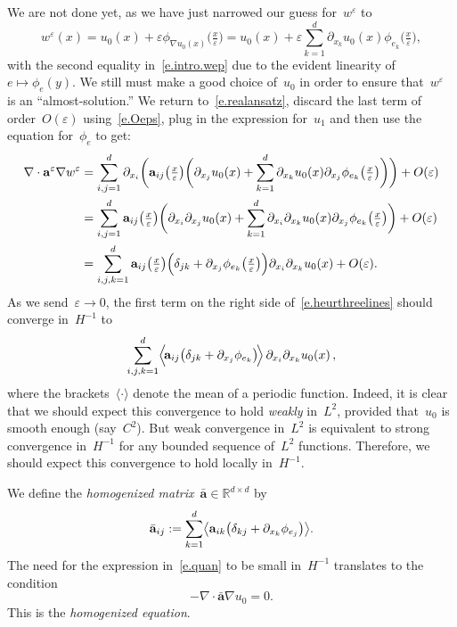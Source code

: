 \documentclass[11pt,twoside]{article} %
\numberwithin{equation}{section}
\theoremstyle{definition}
\let\originalleft\left
\let\originalright\right
\renewcommand{\left}{\mathopen{}\mathclose\bgroup\originalleft}
\renewcommand{\right}{\aftergroup\egroup\originalright}
\newcommand*{\R}{\ensuremath{\mathbb{R}}}
\newcommand{\eps}{\varepsilon}
\newcommand{\ep}{\eps}
\renewcommand{\a}{\mathbf{a}}
\newcommand{\ahom}{\bar{\a}}
\begin{document}
\smallskip

We are not done yet, as we have just narrowed our guess for~$w^\ep$ to 
\begin{equation}
\label{e.intro.wep}
w^\ep (x) = u_0(x) + \ep \phi_{\nabla u_0(x)}\bigl(\tfrac x\ep \bigr) 
= 
u_0(x) + \ep \sum_{k=1}^d \partial_{x_k}u_0(x) \phi_{e_k}\bigl(\tfrac x\ep \bigr),
\end{equation}
with the second equality in~\eqref{e.intro.wep} due to the evident linearity of~$e\mapsto \phi_e(y)$. We still must make a good choice of~$u_0$ in order to ensure that~$w^\ep$ is an ``almost-solution.'' We return to~\eqref{e.realansatz}, discard the last term of order~$O(\ep)$ using~\eqref{e.Oeps}, plug in the expression for~$u_1$ and then use the equation for~$\phi_e$ to get:
\begin{align}
\label{e.heurthreelines}
\nabla \cdot\a^\ep \nabla w^\ep 
&
=
\sum_{i,j=1}^d
\partial_{x_i} 
\biggl(
\a_{ij}\bigl(\tfrac x\ep \bigr) 
\biggl(
\partial_{x_j} u_0(x) 
+
\sum_{k=1}^d \partial_{x_k}u_0(x) \partial_{x_j} \phi_{e_k} \bigl(\tfrac x\ep \bigr)
\biggr)
\biggr)
+O(\ep)
\notag \\ &
=
\sum_{i,j=1}^d
\a_{ij}\bigl(\tfrac x\ep \bigr)
\biggl( \partial_{x_i}\partial_{x_j} u_0(x) + 
\sum_{k=1}^d \partial_{x_i}\partial_{x_k}u_0(x) \partial_{x_j} \phi_{e_k} \bigl(\tfrac x\ep \bigr) \biggr)
+O(\ep)
\notag \\ &
=
\sum_{i,j,k=1}^d
\a_{ij}\bigl(\tfrac x\ep \bigr) 
\Bigl( \delta_{jk} 
+ 
\partial_{x_j} \phi_{e_k} \bigl(\tfrac x\ep \bigr) \Bigr)
\partial_{x_i}\partial_{x_k} u_0(x) 
+ O(\ep).
\end{align}
As we send~$\ep \to 0$, the first term on the right side of~\eqref{e.heurthreelines} should converge in~$H^{-1}$ to 
\begin{equation}
\label{e.quan}
\sum_{i,j,k=1}^d
\Bigl\langle \!
\a_{ij}\left( \delta_{jk} 
+ 
\partial_{x_j} \phi_{e_k} \right)
\! \Bigr\rangle \,
\partial_{x_i}\partial_{x_k} u_0(x)\,,
\end{equation}
where the brackets~$\langle \cdot \rangle$ denote the mean of a periodic function.
Indeed, it is clear that we should expect this convergence to hold \emph{weakly} in~$L^2$, provided that~$u_0$ is smooth enough (say~$C^2$). But weak convergence in~$L^2$ is equivalent to strong convergence in~$H^{-1}$ for any bounded sequence of~$L^2$ functions. Therefore, we should expect this convergence to hold locally in~$H^{-1}$. 

\smallskip

We define the \emph{homogenized matrix}~$\ahom\in \R^{d\times d}$ by
\begin{equation}
\ahom_{ij} 
:= 
\sum_{k=1}^d 
\left\langle \a_{ik}\left( \delta_{kj} 
+ 
\partial_{x_k} \phi_{e_j} \right)
\right\rangle.
\end{equation}
The need for the expression in~\eqref{e.quan} to be small in~$H^{-1}$ translates to the condition
\begin{equation}
\label{e.pde.homoge}
-\nabla \cdot \ahom \nabla u_0 = 0. 
\end{equation}
This is the \emph{homogenized equation}. 
\end{document}
